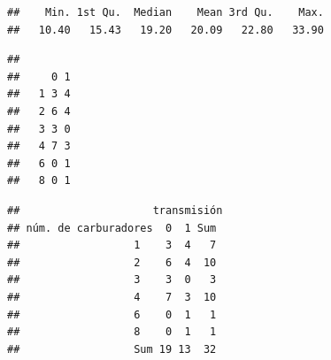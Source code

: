 \documentclass[
]{article}
\newenvironment{Shaded}{\begin{snugshade}}{\end{snugshade}}
\newcommand{\AttributeTok}[1]{\textcolor[rgb]{0.13,0.29,0.53}{#1}}
\newcommand{\CommentTok}[1]{\textcolor[rgb]{0.56,0.35,0.01}{\textit{#1}}}
\newcommand{\ConstantTok}[1]{\textcolor[rgb]{0.56,0.35,0.01}{#1}}
\newcommand{\FunctionTok}[1]{\textcolor[rgb]{0.13,0.29,0.53}{\textbf{#1}}}
\newcommand{\NormalTok}[1]{#1}
\newcommand{\SpecialCharTok}[1]{\textcolor[rgb]{0.81,0.36,0.00}{\textbf{#1}}}
\newcommand{\StringTok}[1]{\textcolor[rgb]{0.31,0.60,0.02}{#1}}
\begin{document}
\begin{verbatim}
##    Min. 1st Qu.  Median    Mean 3rd Qu.    Max. 
##   10.40   15.43   19.20   20.09   22.80   33.90
\end{verbatim}

\begin{Shaded}
\end{Shaded}

\begin{verbatim}
##    
##     0 1
##   1 3 4
##   2 6 4
##   3 3 0
##   4 7 3
##   6 0 1
##   8 0 1
\end{verbatim}

\begin{Shaded}
\end{Shaded}

\begin{verbatim}
##                     transmisión
## núm. de carburadores  0  1 Sum
##                  1    3  4   7
##                  2    6  4  10
##                  3    3  0   3
##                  4    7  3  10
##                  6    0  1   1
##                  8    0  1   1
##                  Sum 19 13  32
\end{verbatim}

\begin{Shaded}
\end{Shaded}
\end{document}
